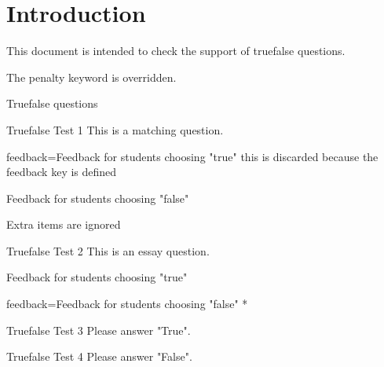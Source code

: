 \documentclass{article}
\begin{document}
	
\section*{Introduction}

This document is intended to check the support of truefalse questions.

The penalty keyword is overridden.

\begin{quiz}[points=3]{Truefalse questions}

\begin{truefalse}[feedback={general feedback},penalty=3]{Truefalse Test 1}
This is a matching question.
\item[feedback={Feedback for students choosing "true"}] this is discarded 
because the feedback key is defined
\item* Feedback for students choosing "false"
\item* Extra items are ignored
\end{truefalse}

\begin{truefalse}[feedback={general feedback}]{Truefalse Test 2}
This is an essay question.
\item Feedback for students choosing "true"
\item[feedback={Feedback for students choosing "false"}]*
\end{truefalse}

\begin{truefalse}[feedback={general feedback}]{Truefalse Test 3}
Please answer "True".
\item*
\end{truefalse}

\begin{truefalse}[feedback={general feedback}]{Truefalse Test 4}
Please answer "False".
\item %
\item*
\end{truefalse}

\end{quiz}
\end{document}
